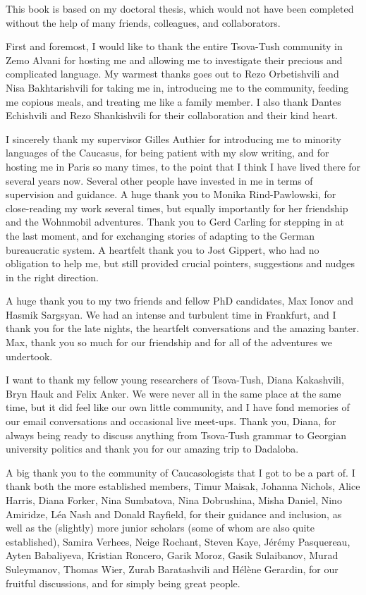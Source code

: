\addchap{\lsAcknowledgementTitle} 

This book is based on my doctoral thesis, which would not have been completed without the help of many friends, colleagues, and collaborators.

First and foremost, I would like to thank the entire Tsova-Tush community in Zemo Alvani for hosting me and allowing me to investigate their precious and complicated language. My warmest thanks goes out to Rezo Orbetishvili and Nisa Bakhtarishvili for taking me in, introducing me to the community, feeding me copious meals, and treating me like a family member. I also thank Dantes Echishvili and Rezo Shankishvili for their collaboration and their kind heart.

I sincerely thank my supervisor Gilles Authier for introducing me to minority languages of the Caucasus, for being patient with my slow writing, and for hosting me in Paris so many times, to the point that I think I have lived there for several years now. Several other people have invested in me in terms of supervision and guidance. A huge thank you to Monika Rind-Pawlowski, for close-reading my work several times, but equally importantly for her friendship and the Wohnmobil adventures. Thank you to Gerd Carling for stepping in at the last moment, and for exchanging stories of adapting to the German bureaucratic system. A heartfelt thank you to Jost Gippert, who had no obligation to help me, but still provided crucial pointers, suggestions and nudges in the right direction.

A huge thank you to my two friends and fellow PhD candidates, Max Ionov and Hasmik Sargsyan. We had an intense and turbulent time in Frankfurt, and I thank you for the late nights, the heartfelt conversations and the amazing banter. Max, thank you so much for our friendship and for all of the adventures we undertook.

I want to thank my fellow young researchers of Tsova-Tush, Diana Kakashvili, Bryn Hauk and Felix Anker. We were never all in the same place at the same time, but it did feel like our own little community, and I have fond memories of our email conversations and occasional live meet-ups. Thank you, Diana, for always being ready to discuss anything from Tsova-Tush grammar to Georgian university politics and thank you for our amazing trip to Dadaloba.

A big thank you to the community of Caucasologists that I got to be a part of. I thank both the more established members, Timur Maisak, Johanna Nichols, Alice Harris, Diana Forker, Nina Sumbatova, Nina Dobrushina, Misha Daniel, Nino Amiridze, Léa Nash and Donald Rayfield, for their guidance and inclusion, as well as the (slightly) more junior scholars (some of whom are also quite established), Samira Verhees, Neige Rochant, Steven Kaye, Jérémy Pasquereau, Ayten Babaliyeva, Kristian Roncero, Garik Moroz, Gasik Sulaibanov, Murad Suleymanov, Thomas Wier, Zurab Baratashvili and Hélène Gerardin, for our fruitful discussions, and for simply being great people.

